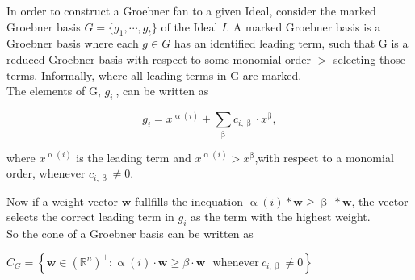 In order to construct a Groebner fan to a given Ideal, consider the marked Groebner basis $G = \lbrace g_{1},\cdots,g_{t}\rbrace $ of the Ideal $I$.
A marked Groebner basis is a Groebner basis where each $g \in G$ has an identified leading term, such that G is a reduced Groebner basis with respect to some monomial order $>$ selecting those terms.
Informally, where all leading terms in G are marked.\\
\newline
The elements of G, $g_{i}~$, can be written as
\begin{center}
\[ g_{i} = x^{\upalpha\left( i\right) } +  \sum_{\upbeta} c_{i,\upbeta} \cdot x^{\upbeta}, \] 
\end{center}
where $ x^{\upalpha\left( i\right) }$ is the leading term and $ x^{\upalpha\left( i\right) } > x^{\upbeta} $,with respect to a monomial order, whenever $c_{i,\upbeta} \neq 0 $.

Now if a weight vector $\textbf{w}$ fullfills the inequation
$\upalpha\left( i\right) \ast \textbf{w} \geq \upbeta~\ast\textbf{w}$, the vector selects the correct leading term in $g_{i}$ as the term with the highest weight.\\

So the cone of a Groebner basis can be written as \cite{coxOshea}\\
\begin{center}
$C_{G} = \left\lbrace \textbf{w} \in \left(\mathbb{R}^{n}\right)^{+} : \upalpha\left( i\right) \cdot \textbf{w} \geq \beta \cdot \textbf{w}~~~ \textrm{whenever}~ c_{i,\upbeta} \neq 0 \right\rbrace   $
\end{center}


